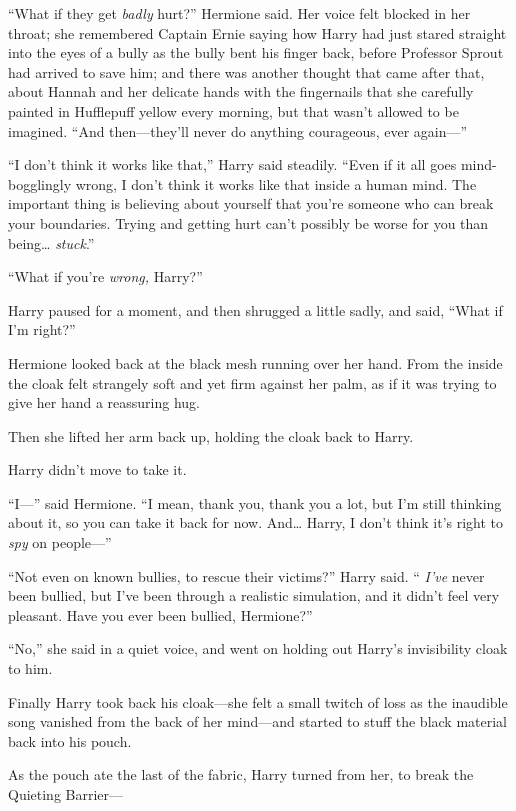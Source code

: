``What if they get \emph{badly} hurt?'' Hermione said. Her voice felt
blocked in her throat; she remembered Captain Ernie saying how Harry had
just stared straight into the eyes of a bully as the bully bent his
finger back, before Professor Sprout had arrived to save him; and there
was another thought that came after that, about Hannah and her delicate
hands with the fingernails that she carefully painted in Hufflepuff
yellow every morning, but that wasn't allowed to be imagined. ``And
then---they'll never do anything courageous, ever again---''

``I don't think it works like that,'' Harry said steadily. ``Even if it
all goes mind-bogglingly wrong, I don't think it works like that inside
a human mind. The important thing is believing about yourself that
you're someone who can break your boundaries. Trying and getting hurt
can't possibly be worse for you than being\ldots{} \emph{stuck}.''

``What if you're \emph{wrong,} Harry?''

Harry paused for a moment, and then shrugged a little sadly, and said,
``What if I'm right?''

Hermione looked back at the black mesh running over her hand. From the
inside the cloak felt strangely soft and yet firm against her palm, as
if it was trying to give her hand a reassuring hug.

Then she lifted her arm back up, holding the cloak back to Harry.

Harry didn't move to take it.

``I---'' said Hermione. ``I mean, thank you, thank you a lot, but I'm
still thinking about it, so you can take it back for now. And\ldots{}
Harry, I don't think it's right to \emph{spy} on people---''

``Not even on known bullies, to rescue their victims?'' Harry said. ``
\emph{I've} never been bullied, but I've been through a realistic
simulation, and it didn't feel very pleasant. Have you ever been
bullied, Hermione?''

``No,'' she said in a quiet voice, and went on holding out Harry's
invisibility cloak to him.

Finally Harry took back his cloak---she felt a small twitch of loss as
the inaudible song vanished from the back of her mind---and started to
stuff the black material back into his pouch.

As the pouch ate the last of the fabric, Harry turned from her, to break
the Quieting Barrier---

